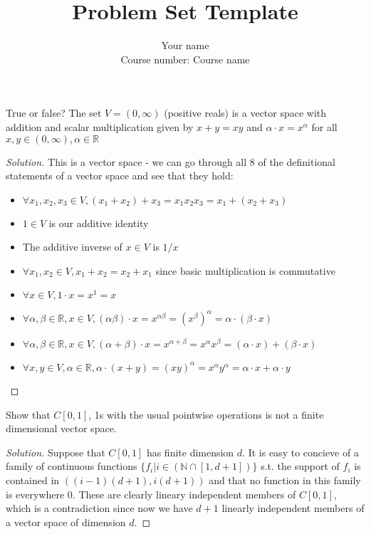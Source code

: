 \documentclass[10pt]{article}
\newenvironment{problem}[2][Problem]{\begin{trivlist}
		\item[\hskip \labelsep {\bfseries #1}\hskip \labelsep {\bfseries #2.}]}{\end{trivlist}}
\begin{document}
	
	\title{Problem Set Template}
	\author{Your name\\
		Course number: Course name}
	\maketitle
	
	\begin{problem}{1.1}
		True or false? The set $V=(0,\infty)$ (positive reals) is a vector space
		with addition and scalar multiplication given by $x+y = xy$ and $\alpha\cdot x = x^\alpha$ for
		all $x,y\in(0,\infty),\alpha\in\mathbb{R}$
	\end{problem}
	
	\begin{proof}[Solution]
		This is a vector space - we can go through all 8 of the definitional statements of a vector space and see that they hold:
		\begin{itemize}
			\item $\forall x_1,x_2,x_3\in V,(x_1+x_2)+x_3 = x_1x_2x_3 = x_1+(x_2+x_3)$
			\item $1\in V$ is our additive identity
			\item The additive inverse of $x \in V$ is $1/x$
			\item $\forall x_1,x_2 \in V, x_1+x_2 = x_2+x_1$ since basic multiplication is commutative
			\item $\forall x\in V,1\cdot x=x^1=x$
			\item $\forall \alpha,\beta\in \mathbb{R},x\in V,(\alpha\beta)\cdot x = x^{\alpha\beta} = (x^\beta)^\alpha = \alpha\cdot(\beta\cdot x)$
			\item $\forall \alpha,\beta\in\mathbb{R},x\in V,(\alpha+\beta)\cdot x=x^{\alpha+\beta}=x^\alpha x^\beta = (\alpha\cdot x)+(\beta\cdot x)$
			\item $\forall x,y\in V, \alpha\in \mathbb{R},\alpha\cdot(x+y)=(xy)^\alpha=x^\alpha y^\alpha = \alpha\cdot x + \alpha\cdot y$
		\end{itemize}
	\end{proof}

	\begin{problem}{1.2}
		Show that $C[0,1]$, 1s with the usual
		pointwise operations is not a ﬁnite dimensional vector space.
	\end{problem}
	
	\begin{proof}[Solution]
		Suppose that $C[0,1]$ has finite dimension $d$. It is easy to concieve of a family of continuous functions $\{f_i|i\in(\mathbb{N}\cap[1,d+1])\}$ s.t. the support of $f_i$ is contained in $((i-1)(d+1),i(d+1))$ and that no function in this family is everywhere 0. These are clearly lineary independent members of $C[0,1]$, which is a contradiction since now we have $d+1$ linearly independent members of a vector space of dimension $d$.
	\end{proof}
\end{document}
